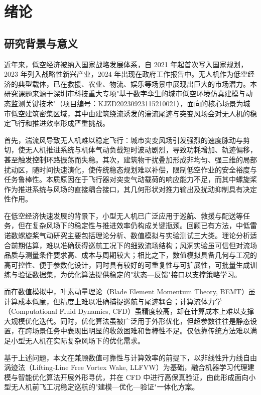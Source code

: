 
\chapter{绪论}

\section{研究背景与意义}

近年来，低空经济被纳入国家战略发展体系，自 2021 年起首次写入国家规划，2023 年列入战略性新兴产业，2024 年出现在政府工作报告中。无人机作为低空经济的典型载体，已在救援、农业、物流、娱乐等场景中展现出巨大的市场潜力\cite{Cai2014}。本研究课题来源于深圳市科技重大专项"基于数字孪生的城市低空环境仿真建模与动态监测关键技术"（项目编号：KJZD20230923115210021），面向的核心场景为城市低空建筑密集区域，其中由建筑绕流诱发的湍流尾迹与突变风场会对无人机的稳定飞行和推进效率形成严重挑战\cite{Mohamed2023}。

首先，湍流风导致无人机难以稳定飞行：城市突变风场引发强烈的速度脉动与剪切，使无人机推进系统与机体气动负载短时波动剧烈，导致功耗增加、轨迹偏移，甚至触发控制环路振荡而失稳。其次，建筑物干扰叠加形成非均匀、强三维的局部扰动区，随时间快速演化，使传统稳态规划难以补偿，限制低空作业的安全裕度与任务鲁棒性。本质原因在于飞行器对突变气动载荷的响应能力不足，而其中螺旋桨作为推进系统与风场的直接耦合接口，其几何形状对推力输出及扰动抑制具有决定性作用。

在低空经济快速发展的背景下，小型无人机已广泛应用于巡航、救援与配送等任务，但在复杂风场下的稳定性与推进效率仍构成关键瓶颈。回顾已有方法，中低雷诺数螺旋桨气动研究主要包括理论分析、数值模拟与实验测试三大类。理论分析适合前期估算，难以准确获得巡航工况下的细致流场结构；风洞实验虽可信但对流场品质与测量条件要求高、成本与周期较大；相比之下，数值模拟具备几何与工况的高可控性、便于参数化设计，同时具有较好的可重复性与可扩展性，可批量生成训练与验证数据集，为优化算法提供稳定的"状态—反馈"接口以支撑策略学习。

而在数值模拟中，叶素动量理论（Blade Element Momentum Theory, BEMT）虽计算成本低廉，但精度上难以准确捕捉巡航与尾迹耦合；计算流体力学（Computational Fluid Dynamics, CFD）虽精度较高，却在计算成本上难以支撑大规模优化迭代。同时，优化算法虽被广泛用于外形优化，但超参数往往是静态设置，在跨场景任务中表现出明显的收敛困难和鲁棒性不足。仅依靠传统方法难以满足小型无人机在实际复杂风场下的优化需求。

基于上述问题，本文在兼顾数值可靠性与计算效率的前提下，以非线性升力线自由涡迹法（Lifting-Line Free Vortex Wake, LLFVW）为基础，融合机器学习代理建模与智能优化算法开展外形寻优，并在 CFD 中进行高保真验证，由此形成面向小型无人机前飞工况稳定巡航的"建模—优化—验证"一体化方案。

